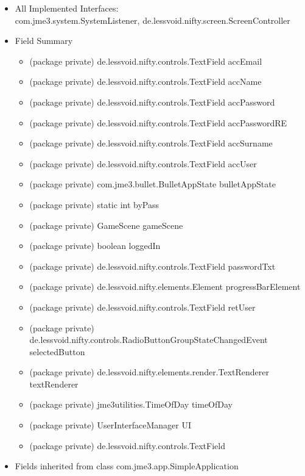 \documentclass[letterpaper]{article}
\begin{document}
						\begin{itemize}
							\item 	All Implemented Interfaces: \\
									com.jme3.system.SystemListener, de.lessvoid.nifty.screen.ScreenController
							\item	Field Summary
									\begin{itemize}
										\item	(package private) de.lessvoid.nifty.controls.TextField	accEmail 
										\item	(package private) de.lessvoid.nifty.controls.TextField	accName 
										\item	(package private) de.lessvoid.nifty.controls.TextField	accPassword 
										\item	(package private) de.lessvoid.nifty.controls.TextField	accPasswordRE 
										\item	(package private) de.lessvoid.nifty.controls.TextField	accSurname 
										\item	(package private) de.lessvoid.nifty.controls.TextField	accUser 
										\item	(package private) com.jme3.bullet.BulletAppState	bulletAppState 
										\item	(package private) static int	byPass 
										\item	(package private) GameScene	gameScene 
										\item	(package private) boolean	loggedIn 
										\item	(package private) de.lessvoid.nifty.controls.TextField	passwordTxt 
										\item	(package private) de.lessvoid.nifty.elements.Element	progressBarElement 
										\item	(package private) de.lessvoid.nifty.controls.TextField	retUser 
										\item	(package private) de.lessvoid.nifty.controls.RadioButtonGroupStateChangedEvent	selectedButton 
										\item	(package private) de.lessvoid.nifty.elements.render.TextRenderer	textRenderer 
										\item	(package private) jme3utilities.TimeOfDay	timeOfDay 
										\item	(package private) UserInterfaceManager	UI 
										\item	(package private) de.lessvoid.nifty.controls.TextField
									\end{itemize} 
							\item	Fields inherited from class com.jme3.app.SimpleApplication \\

\end{itemize}
\end{document}
